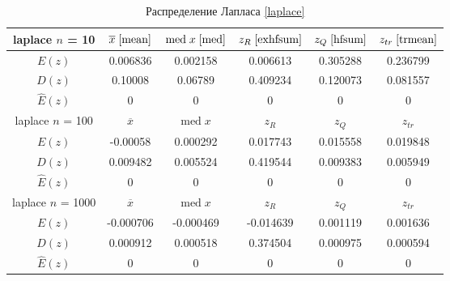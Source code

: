 \documentclass[a4paper,12pt]{article} %
\begin{document}
\begin{table}[H]
    \centering
    \begin{tabular}{|c|c|c|c|c|c|}
        \hline
         laplace  $n$ = 10&$\overline{x}\;\eqref{mean}$&$\mathrm{med}\;x\;\eqref{med}$&$z_R\;\eqref{exhfsum}$&$z_Q\;\eqref{hfsum}$&$z_{tr}\;\eqref{trmean}$\\
        \hline
        $E(z)$&0.006836&0.002158&0.006613&0.305288&0.236799\\
        \hline
        $D(z)$&0.10008&0.06789&0.409234&0.120073&0.081557\\
        \hline
        $\hat{E}(z)$&0&0&0&0&0\\
        \hline
        laplace  $n$ = 100&$\overline{x}$&$\mathrm{med}\;x$&$z_R$&$z_Q$&$z_{tr}$\\
        \hline
        $E(z)$&-0.00058&0.000292&0.017743&0.015558&0.019848\\
        \hline
        $D(z)$&0.009482&0.005524&0.419544&0.009383&0.005949\\
        \hline
        $\hat{E}(z)$&0&0&0&0&0\\
        \hline
        laplace  $n$ = 1000 &$\overline{x}$&$\mathrm{med}\;x$&$z_R$&$z_Q$&$z_{tr}$\\
        \hline
        $E(z)$&-0.000706&-0.000469&-0.014639&0.001119&0.001636\\
        \hline
        $D(z)$&0.000912&0.000518&0.374504&0.000975&0.000594\\
        \hline
        $\hat{E}(z)$&0&0&0&0&0\\
        \hline
    \end{tabular}
    \caption{Распределение Лапласа \eqref{laplace}}
    \label{tab:laplace}
\end{table}
\end{document}
